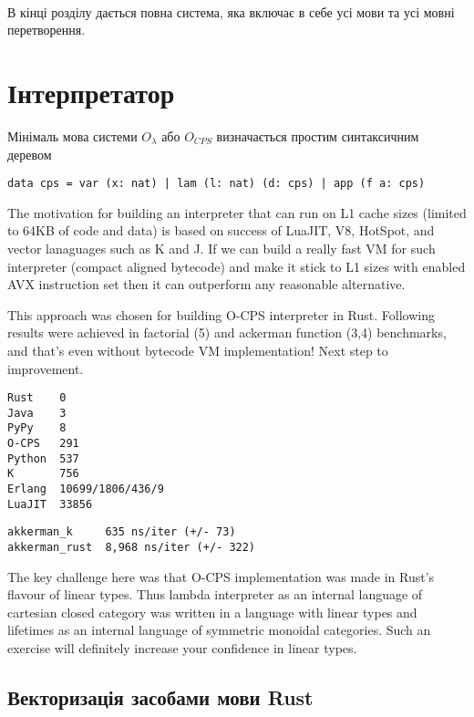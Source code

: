 \paragraph{}
В кінці розділу дається повна система, яка включає в себе усі
мови та усі мовні перетворення.

\newpage
\section{Інтерпретатор}

Мінімаль мова системи $O_\lambda$ або $O_{CPS}$ визначається простим
синтаксичним деревом

\begin{lstlisting}
data cps = var (x: nat) | lam (l: nat) (d: cps) | app (f a: cps)
\end{lstlisting}

The motivation for building an interpreter that can run on L1 cache
sizes (limited to 64KB of code and data) is based on success of LuaJIT,
V8, HotSpot, and vector lanaguages such as K and J. If we can build a
really fast VM for such interpreter (compact aligned bytecode) and
make it stick to L1 sizes with enabled AVX instruction set then it
can outperform any reasonable alternative.

This approach was chosen for building O-CPS interpreter in Rust.
Following results were achieved in factorial (5) and ackerman
function (3,4) benchmarks, and that's even without bytecode VM
implementation! Next step to improvement.

\begin{lstlisting}
Rust    0
Java    3
PyPy    8
O-CPS   291
Python  537
K       756
Erlang  10699/1806/436/9
LuaJIT  33856
\end{lstlisting}

\begin{lstlisting}
akkerman_k     635 ns/iter (+/- 73)
akkerman_rust  8,968 ns/iter (+/- 322)
\end{lstlisting}

The key challenge here was that O-CPS implementation was made
in Rust's flavour of linear types. Thus lambda interpreter as
an internal language of cartesian closed category was written
in a language with linear types and lifetimes as an internal
language of symmetric monoidal categories. Such an exercise
will definitely increase your confidence in linear types.

\subsection{Векторизація засобами мови Rust}


